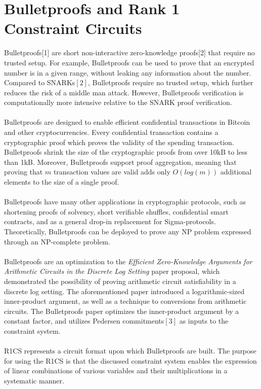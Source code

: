 \documentclass{article}
\begin{document}
\section{Bulletproofs and Rank 1 Constraint Circuits} 
Bulletproofs[1] are short non-interactive zero-knowledge proofs[2] that require no trusted setup. For example, Bulletproofs can be used to prove that an encrypted number is in a given range, without leaking any information about the number. Compared to SNARKs$[2]$, Bulletproofs require no trusted setup, which further reduces the risk of a middle man attack. However, Bulletproofs verification is computationally more intensive relative to the SNARK proof verification.\\\\
Bulletproofs are designed to enable efficient confidential transactions in Bitcoin and other cryptocurrencies. Every confidential transaction contains a cryptographic proof which proves the validity of the spending transaction. Bulletproofs shrink the size of the cryptographic proofs from over 10kB to less than 1kB. Moreover, Bulletproofs support proof aggregation, meaning that proving that $m$ transaction values are valid adds only $O(log(m))$ additional elements to the size of a single proof.\\\\
Bulletproofs have many other applications in cryptographic protocols, such as shortening proofs of solvency, short verifiable shuffles, confidential smart contracts, and as a general drop-in replacement for Sigma-protocols. Theoretically, Bulletproofs can be deployed to prove any NP problem expressed through an NP-complete problem.\\\\
Bulletproofs are an optimization to the \emph{Efficient Zero-Knowledge Arguments for
Arithmetic Circuits in the Discrete Log Setting} paper proposal, which demonstrated the possibility of proving arithmetic circuit satisfiability in a discrete log setting. The aforementioned paper introduced a logarithmic-sized inner-product argument, as well as a technique to conversions from arithmetic circuits. The Bulletproofs paper optimizes the inner-product argument by a constant factor, and utilizes Pedersen commitments$[3]$ as inputs to the constraint system.\\\\
R1CS represents a circuit format upon which Bulletproofs are built. The purpose for using the R1CS is that the discussed constraint system enables the expression of linear combinations of various variables and their multiplications in a systematic manner.\\
\end{document}
